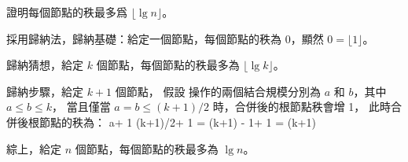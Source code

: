 \startEXERCISE[exercise:19.4-2]
證明每個節點的秩最多爲 $\lfloor \lg n\rfloor$。
\stopEXERCISE

\startANSWER
採用歸納法，歸納基礎：給定一個節點，每個節點的秩為 0，顯然 $0=\lfloor 1\rfloor$。

歸納猜想，給定 $k$ 個節點，每個節點的秩最多為 $\lfloor \lg k\rfloor$。

歸納步驟，給定 $k+1$ 個節點，
假設  操作的兩個結合規模分別為 $a$ 和 $b$，其中 $a\le b\le k$，
當且僅當 $a=b\le(k+1)/2$ 時，合併後的根節點秩會增 1，
此時合併後根節點的秩為：
\startformula\startmathalignment
\NC \NC \lfloor\lg a\rfloor + 1 \NR
\NC \le \NC \lfloor\lg(k+1)/2\rfloor + 1 \NR
\NC = \NC \lfloor\lg(k+1) - 1\rfloor + 1 \NR
\NC = \NC \lfloor\lg(k+1)\rfloor \NR
\stopmathalignment\stopformula

綜上，給定 $n$ 個節點，每個節點的秩最多為 $\lg n$。
\stopANSWER